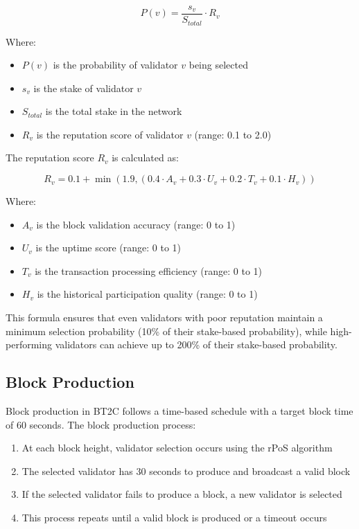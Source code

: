 \documentclass[10pt,a4paper]{article}
\begin{document}
\begin{equation}
P(v) = \frac{s_v}{S_{total}} \cdot R_v
\end{equation}

Where:
\begin{itemize}
\item $P(v)$ is the probability of validator $v$ being selected
\item $s_v$ is the stake of validator $v$
\item $S_{total}$ is the total stake in the network
\item $R_v$ is the reputation score of validator $v$ (range: 0.1 to 2.0)
\end{itemize}

The reputation score $R_v$ is calculated as:

\begin{equation}
R_v = 0.1 + \min(1.9, (0.4 \cdot A_v + 0.3 \cdot U_v + 0.2 \cdot T_v + 0.1 \cdot H_v))
\end{equation}

Where:
\begin{itemize}
\item $A_v$ is the block validation accuracy (range: 0 to 1)
\item $U_v$ is the uptime score (range: 0 to 1)
\item $T_v$ is the transaction processing efficiency (range: 0 to 1)
\item $H_v$ is the historical participation quality (range: 0 to 1)
\end{itemize}

This formula ensures that even validators with poor reputation maintain a minimum selection probability (10\% of their stake-based probability), while high-performing validators can achieve up to 200\% of their stake-based probability.

\subsection{Block Production}
Block production in BT2C follows a time-based schedule with a target block time of 60 seconds. The block production process:

\begin{enumerate}
\item At each block height, validator selection occurs using the rPoS algorithm
\item The selected validator has 30 seconds to produce and broadcast a valid block
\item If the selected validator fails to produce a block, a new validator is selected
\item This process repeats until a valid block is produced or a timeout occurs
\end{enumerate}
\end{document}
